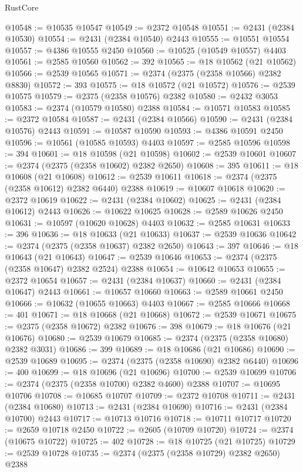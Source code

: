 \begin{lexlean}{RustCore}
\begin{coremodule}
@10548 := @10535 @10547
@10549 := @2372 @10548
@10551 := @2431 (@2384 @10530)
@10554 := @2431 (@2384 @10540) @2443
@10555 := @10551 @10554
@10557 := @4386 @10555 @2450
@10560 := @10525 (@10549 @10557) @4403
@10561 := @2585 @10560
@10562 := 392
@10565 := @18 @10562 (@21 @10562)
@10566 := @2539 @10565
@10571 := @2374 (@2375 (@2358 @10566) @2382 @8830)
@10572 := 393
@10575 := @18 @10572 (@21 @10572)
@10576 := @2539 @10575
@10579 := @2375 (@2358 @10576) @2382
@10580 := @2432 @3053
@10583 := @2374 (@10579 @10580) @2388
@10584 := @10571 @10583
@10585 := @2372 @10584
@10587 := @2431 (@2384 @10566)
@10590 := @2431 (@2384 @10576) @2443
@10591 := @10587 @10590
@10593 := @4386 @10591 @2450
@10596 := @10561 (@10585 @10593) @4403
@10597 := @2585 @10596
@10598 := 394
@10601 := @18 @10598 (@21 @10598)
@10602 := @2539 @10601
@10607 := @2374 (@2375 (@2358 @10602) @2382 @2650)
@10608 := 395
@10611 := @18 @10608 (@21 @10608)
@10612 := @2539 @10611
@10618 := @2374 (@2375 (@2358 @10612) @2382 @6440) @2388
@10619 := @10607 @10618
@10620 := @2372 @10619
@10622 := @2431 (@2384 @10602)
@10625 := @2431 (@2384 @10612) @2443
@10626 := @10622 @10625
@10628 := @2589 @10626 @2450
@10631 := @10597 (@10620 @10628) @4403
@10632 := @2585 @10631
@10633 := 396
@10636 := @18 @10633 (@21 @10633)
@10637 := @2539 @10636
@10642 := @2374 (@2375 (@2358 @10637) @2382 @2650)
@10643 := 397
@10646 := @18 @10643 (@21 @10643)
@10647 := @2539 @10646
@10653 := @2374 (@2375 (@2358 @10647) @2382 @2524) @2388
@10654 := @10642 @10653
@10655 := @2372 @10654
@10657 := @2431 (@2384 @10637)
@10660 := @2431 (@2384 @10647) @2443
@10661 := @10657 @10660
@10663 := @2589 @10661 @2450
@10666 := @10632 (@10655 @10663) @4403
@10667 := @2585 @10666
@10668 := 401
@10671 := @18 @10668 (@21 @10668)
@10672 := @2539 @10671
@10675 := @2375 (@2358 @10672) @2382
@10676 := 398
@10679 := @18 @10676 (@21 @10676)
@10680 := @2539 @10679
@10685 := @2374 (@2375 (@2358 @10680) @2382 @3031)
@10686 := 399
@10689 := @18 @10686 (@21 @10686)
@10690 := @2539 @10689
@10695 := @2374 (@2375 (@2358 @10690) @2382 @6440)
@10696 := 400
@10699 := @18 @10696 (@21 @10696)
@10700 := @2539 @10699
@10706 := @2374 (@2375 (@2358 @10700) @2382 @4600) @2388
@10707 := @10695 @10706
@10708 := @10685 @10707
@10709 := @2372 @10708
@10711 := @2431 (@2384 @10680)
@10713 := @2431 (@2384 @10690)
@10716 := @2431 (@2384 @10700) @2443
@10717 := @10713 @10716
@10718 := @10711 @10717
@10720 := @2659 @10718 @2450
@10722 := @2605 (@10709 @10720)
@10724 := @2374 (@10675 @10722)
@10725 := 402
@10728 := @18 @10725 (@21 @10725)
@10729 := @2539 @10728
@10735 := @2374 (@2375 (@2358 @10729) @2382 @2650) @2388

\end{coremodule}
\end{lexlean}

